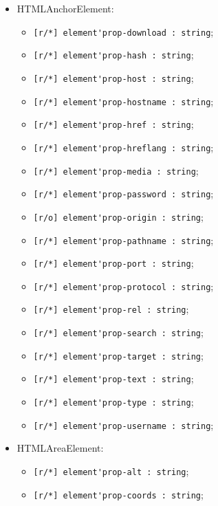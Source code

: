\documentclass[a4paper, 14pt]{extarticle}
\newenvironment{icItems}
	{ \begin{itemize} [noitemsep,nolistsep] }
	{ \end{itemize} }
\begin{document}
\begin{icItems}
	\item HTMLAnchorElement:
	\begin{icItems}
		\item \lstinline|[r/*] element'prop-download : string|;
		\item \lstinline|[r/*] element'prop-hash : string|;
		\item \lstinline|[r/*] element'prop-host : string|;
		\item \lstinline|[r/*] element'prop-hostname : string|;
		\item \lstinline|[r/*] element'prop-href : string|;
		\item \lstinline|[r/*] element'prop-hreflang : string|;
		\item \lstinline|[r/*] element'prop-media : string|;
		\item \lstinline|[r/*] element'prop-password : string|;
		\item \lstinline|[r/o] element'prop-origin : string|;
		\item \lstinline|[r/*] element'prop-pathname : string|;
		\item \lstinline|[r/*] element'prop-port : string|;
		\item \lstinline|[r/*] element'prop-protocol : string|;
		\item \lstinline|[r/*] element'prop-rel : string|;
		\item \lstinline|[r/*] element'prop-search : string|;
		\item \lstinline|[r/*] element'prop-target : string|;
		\item \lstinline|[r/*] element'prop-text : string|;
		\item \lstinline|[r/*] element'prop-type : string|;
		\item \lstinline|[r/*] element'prop-username : string|;
	\end{icItems}
	
	\item HTMLAreaElement:
	\begin{icItems}
		\item \lstinline|[r/*] element'prop-alt : string|;
		\item \lstinline|[r/*] element'prop-coords : string|;
	\end{icItems}
	

\end{icItems}
\end{document}
